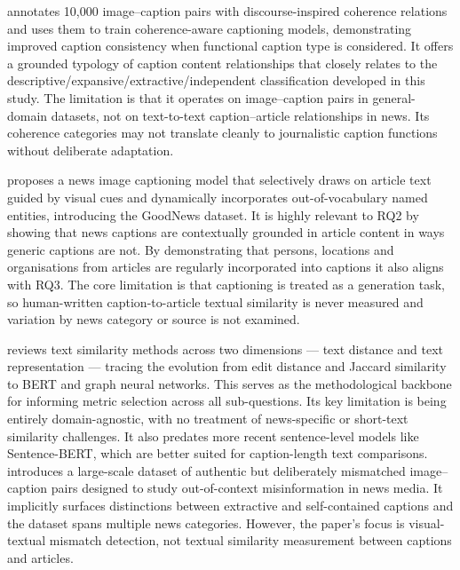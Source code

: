 \documentclass[11pt,a4paper]{article}
\begin{document}
\cite{alikhani2020cross} annotates 10{,}000 image--caption pairs with
discourse-inspired coherence relations and uses them to train
coherence-aware captioning models, demonstrating improved caption consistency
when functional caption type is considered. It offers a grounded typology of
caption content relationships that closely relates to the
descriptive/expansive/extractive/independent classification developed in this
study. The limitation is that it operates on image--caption pairs in
general-domain datasets, not on text-to-text caption--article relationships
in news. Its coherence categories may not translate cleanly to journalistic
caption functions without deliberate adaptation.

\cite{biten2019goodnews} proposes a news image captioning model that
selectively draws on article text guided by visual cues and dynamically
incorporates out-of-vocabulary named entities, introducing the GoodNews
dataset. It is highly relevant to RQ2 by showing that news captions are
contextually grounded in article content in ways generic captions are not.
By demonstrating that persons, locations and organisations from articles are
regularly incorporated into captions it also aligns with RQ3. The core
limitation is that captioning is treated as a generation task, so
human-written caption-to-article textual similarity is never measured and
variation by news category or source is not examined.

\cite{wang2020measurement} reviews text similarity methods across two
dimensions --- text distance and text representation --- tracing the evolution
from edit distance and Jaccard similarity to BERT and graph neural networks.
This serves as the methodological backbone for informing metric selection
across all sub-questions. Its key limitation is being entirely
domain-agnostic, with no treatment of news-specific or short-text similarity
challenges. It also predates more recent sentence-level models like
Sentence-BERT, which are better suited for caption-length text comparisons.
\cite{luo2021newsclippings} introduces a large-scale dataset of authentic
but deliberately mismatched image--caption pairs designed to study
out-of-context misinformation in news media. It implicitly surfaces
distinctions between extractive and self-contained captions and the dataset
spans multiple news categories. However, the paper's focus is visual-textual
mismatch detection, not textual similarity measurement between captions and
articles.
\end{document}
